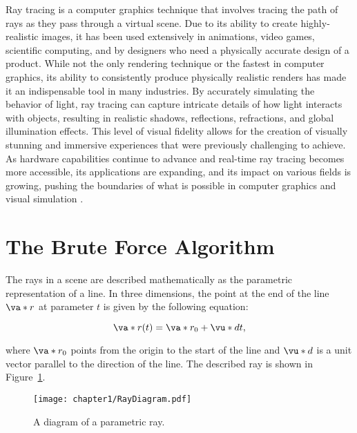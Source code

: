 \par Ray tracing is a computer graphics technique that involves tracing the path of rays as they pass through a virtual scene. Due to its ability to create highly-realistic images, it has been used extensively in animations, video games, scientific computing, and by designers who need a physically accurate design of a product. While not the only rendering technique or the fastest in computer graphics, its ability to consistently produce physically realistic renders has made it an indispensable tool in many industries. By accurately simulating the behavior of light, ray tracing can capture intricate details of how light interacts with objects, resulting in realistic shadows, reflections, refractions, and global illumination effects. This level of visual fidelity allows for the creation of visually stunning and immersive experiences that were previously challenging to achieve. As hardware capabilities continue to advance and real-time ray tracing becomes more accessible, its applications are expanding, and its impact on various fields is growing, pushing the boundaries of what is possible in computer graphics and visual simulation \cite{Peddie}.

\section{The Brute Force Algorithm}
The rays in a scene are described mathematically as the parametric representation of a line. In three dimensions, the point at the end of the line $\va*{r}$ at parameter $t$ is given by the following equation:

\begin{equation}
\va*{r}(t) = \va*{r_0} + \vu*{d} t,
\label{eq:parametric_ray}
\end{equation}

\noindent where $\va*{r_0}$ points from the origin to the start of the line and $\vu*{d}$ is a unit vector parallel to the direction of the line. The described ray is shown in Figure~\ref{fig:ray_diagram}.\\

\begin{figure}[H]
    \centering
	\texttt{[image: chapter1/RayDiagram.pdf]}
	\caption{A diagram of a parametric ray.}
	\label{fig:ray_diagram}
\end{figure}


